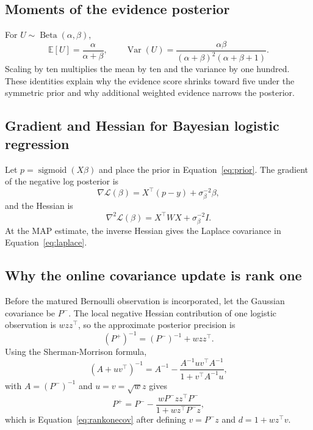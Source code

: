 \documentclass[11pt]{article}
\newcommand{\sigmoid}{\operatorname{sigmoid}}
\newcommand{\E}{\mathbb{E}}
\newcommand{\Var}{\operatorname{Var}}
\begin{document}
\subsection{Moments of the evidence posterior}

For $U\sim\operatorname{Beta}(\alpha,\beta)$,
\begin{equation}
\E[U]=\frac{\alpha}{\alpha+\beta},
\qquad
\Var(U)=\frac{\alpha\beta}{(\alpha+\beta)^2(\alpha+\beta+1)}.
\end{equation}
Scaling by ten multiplies the mean by ten and the variance by one hundred. These identities explain why the evidence score shrinks toward five under the symmetric prior and why additional weighted evidence narrows the posterior.

\subsection{Gradient and Hessian for Bayesian logistic regression}

Let $p=\sigmoid(X\beta)$ and place the prior in Equation~\eqref{eq:prior}. The gradient of the negative log posterior is
\begin{equation}
\nabla\mathcal L(\beta)=X^\top(p-y)+\sigma_\beta^{-2}\beta,
\end{equation}
and the Hessian is
\begin{equation}
\nabla^2\mathcal L(\beta)=X^\top W X+\sigma_\beta^{-2}I.
\end{equation}
At the MAP estimate, the inverse Hessian gives the Laplace covariance in Equation~\eqref{eq:laplace}.

\subsection{Why the online covariance update is rank one}

Before the matured Bernoulli observation is incorporated, let the Gaussian covariance be $P^-$. The local negative Hessian contribution of one logistic observation is $wzz^\top$, so the approximate posterior precision is
\begin{equation}
(P^+)^{-1}=(P^-)^{-1}+wzz^\top.
\end{equation}
Using the Sherman-Morrison formula,
\begin{equation}
(A+uv^\top)^{-1}=A^{-1}-\frac{A^{-1}uv^\top A^{-1}}{1+v^\top A^{-1}u},
\end{equation}
with $A=(P^-)^{-1}$ and $u=v=\sqrt{w}z$ gives
\begin{equation}
P^+=P^- - \frac{wP^-zz^\top P^-}{1+wz^\top P^-z},
\end{equation}
which is Equation~\eqref{eq:rankonecov} after defining $v=P^-z$ and $d=1+wz^\top v$.
\end{document}
